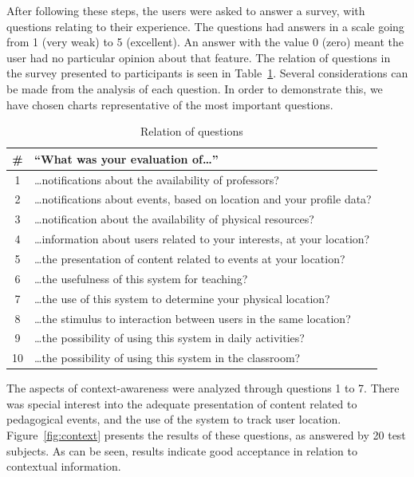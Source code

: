 \documentclass[5p,authoryear]{elsarticle}
\begin{document}
After following these steps, the users were asked to answer a survey, with
questions relating to their experience. The questions had answers in a scale
going from 1 (very weak) to 5 (excellent). An answer with the value 0 (zero)
meant the user had no particular opinion about that feature. The relation of
questions in the survey presented to participants is seen in
Table~\ref{tab:questions}. Several considerations can be made from the analysis
of each question. In order to demonstrate this, we have chosen charts
representative of the most important questions. 

\begin{table}
  \footnotesize
  \begin{tabular}{cp{7.5cm}}
    \toprule
    \# & ``What was your evaluation of\ldots'' \\
    \midrule
     1 & \ldots{}notifications about the availability of professors? \\ 
     2 & \ldots{}notifications about events, based on location and your profile data? \\
     3 & \ldots{}notification about the availability of physical resources? \\
     4 & \ldots{}information about users related to your interests, at your location? \\
     5 & \ldots{}the presentation of content related to events at your location? \\
     6 & \ldots{}the usefulness of this system for teaching? \\
     7 & \ldots{}the use of this system to determine your physical location? \\
     8 & \ldots{}the stimulus to interaction between users in the same location? \\
     9 & \ldots{}the possibility of using this system in daily activities? \\
    10 & \ldots{}the possibility of using this system in the classroom? \\  
    \bottomrule
  \end{tabular}
  \caption{Relation of questions}
  \label{tab:questions}
\end{table}


The aspects of context-awareness were analyzed through questions 1 to 7. There
was special interest into the adequate presentation of content related to
pedagogical events, and the use of the system to track user location.
Figure~\ref{fig:context} presents the results of these questions, as answered
by 20 test subjects. As can be seen, results indicate good acceptance in
relation to contextual information. 
\end{document}

